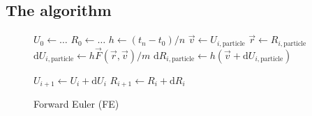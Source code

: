\subsection*{The algorithm}



\begin{figure}
    \begin{algorithm}[H]
    \scriptsize
    \caption{Forward Euler (FE)}
    \label{algo:FE}
        \begin{algorithmic}
            \State $U_0 \leftarrow \dots$         %
            \State $R_0 \leftarrow \dots$        
            \State $h \leftarrow (t_n-t_0)/n$  
            \State $\vec{v} \leftarrow U_{i,\text{particle}}$
            \State $\vec{r} \leftarrow R_{i,\text{particle}}$
            \State $\text{d}U_{i, \text{particle}} \leftarrow h \vec{F}(\vec{r}, \vec{v})/m$
            \State $\text{d}R_{i, \text{particle}} \leftarrow h (\vec{v} + \text{d}U_{i, \text{particle}})$ 
            \EndFor

            \State $U_{i+1} \leftarrow U_{i} + \text{d}U_{i}$ 
            \State $R_{i+1} \leftarrow R_{i} + \text{d}R_{i}$ 
            \EndFor
        \end{algorithmic}
    \end{algorithm}
\end{figure}

